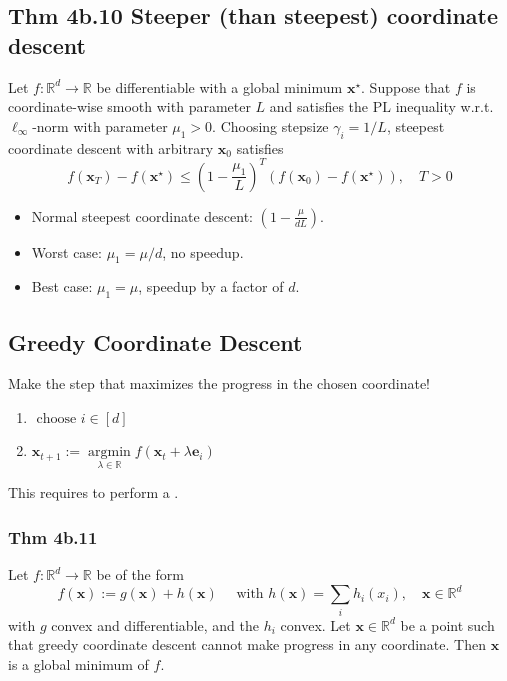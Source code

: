 \subsection*{Thm 4b.10 Steeper (than steepest) coordinate descent}
Let $f: \mathbb{R}^{d} \rightarrow \mathbb{R}$ be differentiable with a global minimum $\mathbf{x}^{\star}$. Suppose that $f$ is coordinate-wise smooth with parameter $L$ and satisfies the $\mathrm{PL}$ inequality w.r.t. $\ell_{\infty}$-norm with parameter $\mu_{1}>0$. Choosing stepsize $\gamma_{i}=1 / L$, steepest coordinate descent with arbitrary $\mathbf{x}_{0}$ satisfies
$$
f\left(\mathbf{x}_{T}\right)-f\left(\mathbf{x}^{\star}\right) \leq\left(1-\frac{\mu_{1}}{L}\right)^{T}\left(f\left(\mathbf{x}_{0}\right)-f\left(\mathbf{x}^{\star}\right)\right), \quad T>0
$$
\begin{itemize}[leftmargin=*]
    \item Normal steepest coordinate descent: $\left(1-\frac{\mu}{d L}\right)$.
    \item Worst case: $\mu_{1}=\mu / d$, no speedup.
    \item Best case: $\mu_{1}=\mu$, speedup by a factor of $d$.
\end{itemize}






\subsection*{Greedy Coordinate Descent}
Make the step that maximizes the progress in the chosen coordinate!
\begin{enumerate}[label = (\roman*), leftmargin=*]
    \item $\text { choose } i \in[d]$
    \item $\mathbf{x}_{t+1}:=\underset{\lambda \in \mathbb{R}}{\operatorname{argmin}} f\left(\mathbf{x}_{t}+\lambda \mathbf{e}_{i}\right)$
\end{enumerate}
This requires to perform a .
\subsubsection*{Thm 4b.11}
Let $f: \mathbb{R}^{d} \rightarrow \mathbb{R}$ be of the form
$$
f(\mathbf{x}):=g(\mathbf{x})+h(\mathbf{x}) \quad \text { with } h(\mathbf{x})=\sum_{i} h_{i}\left(x_{i}\right), \quad \mathbf{x} \in \mathbb{R}^{d}
$$
with $g$ convex and differentiable, and the $h_{i}$ convex. Let $\mathbf{x} \in \mathbb{R}^{d}$ be a point such that greedy coordinate descent cannot make progress in any coordinate. Then $\mathbf{x}$ is a global minimum of $f$.

